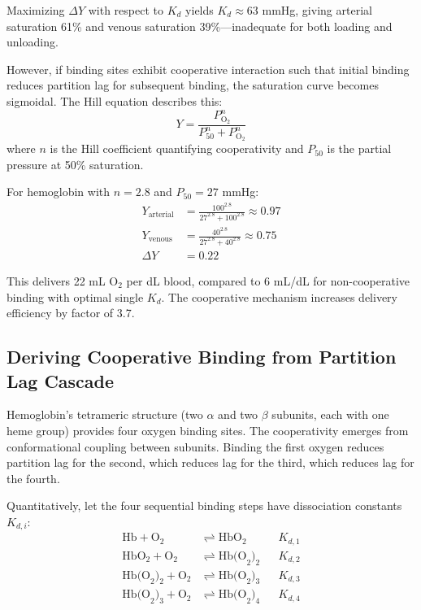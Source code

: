 \documentclass[12pt,a4paper]{article}
\theoremstyle{remark}
\begin{document}
Maximizing $\Delta Y$ with respect to $K_{d}$ yields $K_{d} \approx 63$ mmHg, giving arterial saturation 61\% and venous saturation 39\%—inadequate for both loading and unloading.

However, if binding sites exhibit cooperative interaction such that initial binding reduces partition lag for subsequent binding, the saturation curve becomes sigmoidal. The Hill equation describes this:
\begin{equation}
Y = \frac{P_{\mathrm{O}_{2}}^{n}}{P_{50}^{n} + P_{\mathrm{O}_{2}}^{n}}
\label{eq:hill}
\end{equation}
where $n$ is the Hill coefficient quantifying cooperativity and $P_{50}$ is the partial pressure at 50\% saturation.

For hemoglobin with $n = 2.8$ and $P_{50} = 27$ mmHg:
\begin{align}
Y_{\mathrm{arterial}} &= \frac{100^{2.8}}{27^{2.8} + 100^{2.8}} \approx 0.97 \\
Y_{\mathrm{venous}} &= \frac{40^{2.8}}{27^{2.8} + 40^{2.8}} \approx 0.75 \\
\Delta Y &= 0.22
\end{align}

This delivers 22 mL O$_{2}$ per dL blood, compared to 6 mL/dL for non-cooperative binding with optimal single $K_{d}$. The cooperative mechanism increases delivery efficiency by factor of 3.7.

\subsection{Deriving Cooperative Binding from Partition Lag Cascade}

Hemoglobin's tetrameric structure (two $\alpha$ and two $\beta$ subunits, each with one heme group) provides four oxygen binding sites. The cooperativity emerges from conformational coupling between subunits. Binding the first oxygen reduces partition lag for the second, which reduces lag for the third, which reduces lag for the fourth.

Quantitatively, let the four sequential binding steps have dissociation constants $K_{d,i}$:
\begin{align}
\mathrm{Hb} + \mathrm{O}_{2} &\rightleftharpoons \mathrm{HbO}_{2} &&K_{d,1} \\
\mathrm{HbO}_{2} + \mathrm{O}_{2} &\rightleftharpoons \mathrm{Hb(O}_{2})_{2} &&K_{d,2} \\
\mathrm{Hb(O}_{2})_{2} + \mathrm{O}_{2} &\rightleftharpoons \mathrm{Hb(O}_{2})_{3} &&K_{d,3} \\
\mathrm{Hb(O}_{2})_{3} + \mathrm{O}_{2} &\rightleftharpoons \mathrm{Hb(O}_{2})_{4} &&K_{d,4}
\end{align}
\end{document}
